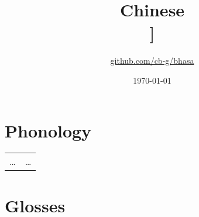 \documentclass{article}
\title{Chinese\\\ipa{[\t{\:t\:s}UNw@n}]}
\author{\href{https://github.com/cb-g/bhasa}{github.com/cb-g/bhasa}}
\date{\today}
\begin{document}
\pagecolor{custom_bg}\color{custom_fg}
\maketitle\thispagestyle{empty}

\newpage\setcounter{page}{1}\section{Phonology}

\begin{xltabular}{\textwidth}{lL}
  \dots & \dots \\
\end{xltabular}

\newpage\section{Glosses}
\end{document}
